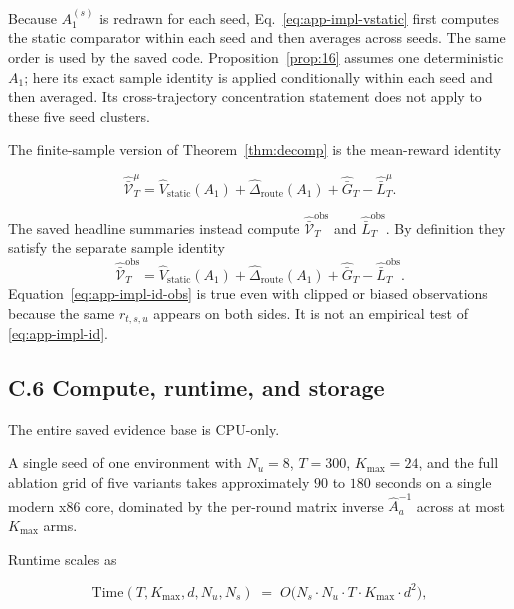 \documentclass{article} %
\begin{document}
Because \(A_1^{(s)}\) is redrawn for each seed, Eq.~\eqref{eq:app-impl-vstatic}
first computes the static comparator within each seed and then averages across
seeds. The same order is used by the saved code. Proposition~\ref{prop:16}
assumes one deterministic \(A_1\); here its exact sample identity is applied
conditionally within each seed and then averaged. Its cross-trajectory
concentration statement does not apply to these five seed clusters.

The finite-sample version of Theorem~\ref{thm:decomp} is the mean-reward identity

\begin{equation}
\label{eq:app-impl-id}
\widehat{\bar{\mathcal V}}_T^\mu
=
\widehat V_{\mathrm{static}}(A_1)
+\widehat\Delta_{\mathrm{route}}(A_1)
+\widehat{\bar G}_T
-\widehat{\bar L}_T^\mu.
\end{equation}

The saved headline summaries instead compute
\(\widehat{\bar{\mathcal V}}_T^{\mathrm{obs}}\) and
\(\widehat{\bar L}_T^{\mathrm{obs}}\). By definition they satisfy the separate
sample identity
\begin{equation}
\label{eq:app-impl-id-obs}
\widehat{\bar{\mathcal V}}_T^{\mathrm{obs}}
=
\widehat V_{\mathrm{static}}(A_1)
+\widehat\Delta_{\mathrm{route}}(A_1)
+\widehat{\bar G}_T
-\widehat{\bar L}_T^{\mathrm{obs}}.
\end{equation}
Equation~\eqref{eq:app-impl-id-obs} is true even with clipped or biased
observations because the same \(r_{t,s,u}\) appears on both sides. It is not an
empirical test of \eqref{eq:app-impl-id}.

\subsection{C.6 Compute, runtime, and storage}

\label{app:impl-compute}

The entire saved evidence base is CPU-only.

A single seed of one environment with $N_u = 8$, $T = 300$, $K_{\max} = 24$, and the full ablation grid of five variants takes approximately $90$ to $180$ seconds on a single modern x86 core, dominated by the per-round matrix inverse $\widehat{A}_a^{-1}$ across at most $K_{\max}$ arms.

Runtime scales as

\begin{equation}
\label{eq:app-impl-runtime}
\mathrm{Time}(T, K_{\max}, d, N_u, N_s) \;=\; O\big(N_s \cdot N_u \cdot T \cdot K_{\max} \cdot d^2\big),
\end{equation}
\end{document}
